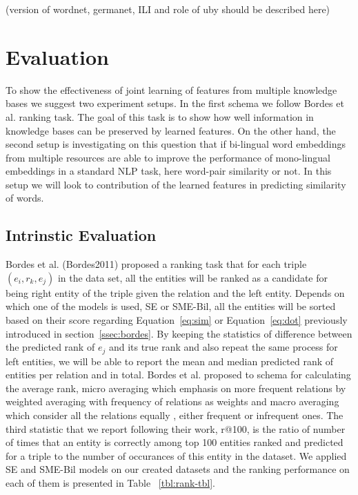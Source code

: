 \documentclass[11pt]{article}
\begin{document}
  (version of wordnet, germanet, ILI and role of uby should be described here)  
 

\section{Evaluation}
\label{sec:eval}

To show the effectiveness of joint learning of features from multiple knowledge bases we suggest 
two experiment setups. In the first schema we follow Bordes et al. ranking task. The goal of this task is
to show how well information in knowledge bases can be preserved by learned features. 
 On the other hand, the second
setup is investigating on this question that if bi-lingual word embeddings from
multiple resources are able to improve the performance of mono-lingual embeddings in a standard NLP
task, here word-pair similarity or not.
In this setup we will look to contribution of the learned features in predicting similarity of words.

\subsection{Intrinstic Evaluation}
\label{ssec:intrinsic}

Bordes et al. (Bordes2011) proposed a ranking task that for each triple $(e_{i} , r_{k}, e_{j} )$ in the data set,
 all the entities will be ranked as a candidate for being right entity of the triple 
 given the relation and the left entity. Depends on which one of the models is used, SE or SME-Bil, all the entities will be sorted
  based on their score regarding Equation~\eqref{eq:sim} or Equation~\ref{eq:dot} previously introduced in section~\ref{ssec:bordes}. 
  By keeping the statistics of difference between the predicted rank of $e_{j}$ and its true rank and also repeat the same process
  for left entities, we will be able to report the mean and median predicted rank of entities per relation and in total. Bordes et al.
   proposed to schema for calculating the average rank, micro averaging which emphasis on more frequent relations by
    weighted averaging with frequency of relations as weights and macro averaging which consider all the relations equally
    , either frequent or infrequent ones. The third statistic that we report following their work, r@100, is the ratio of number of times that 
    an entity is correctly among top 100 entities ranked and predicted for a triple to the number of occurances of this entity in the dataset.
    We applied SE and SME-Bil models on our created datasets and the ranking performance on each of them is presented in Table ~\ref{tbl:rank-tbl}.
	
\end{document}
